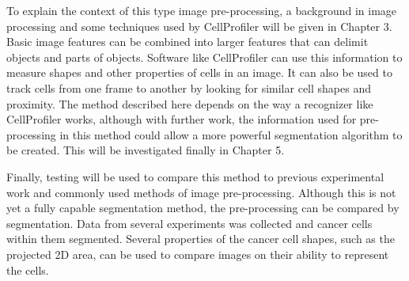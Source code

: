 To explain the context of this type image pre-processing, a background in image processing and some techniques used by CellProfiler will be given in Chapter 3. Basic image features can be combined into larger features that can delimit objects and parts of objects. Software like CellProfiler can use this information to measure shapes and other properties of cells in an image. It can also be used to track cells from one frame to another by looking for similar cell shapes and proximity. The method described here depends on the way a recognizer like CellProfiler works, although with further work, the information used for pre-processing in this method could allow a more powerful segmentation algorithm to be created. This will be investigated finally in Chapter 5.

Finally, testing will be used to compare this method to previous experimental work and commonly used methods of image pre-processing. Although this is not yet a fully capable segmentation method, the pre-processing can be compared by segmentation. Data from several experiments was collected and cancer cells within them segmented. Several properties of the cancer cell shapes, such as the projected 2D area, can be used to compare images on their ability to represent the cells.
